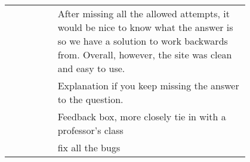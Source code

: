 {\begin{longtable}{R|p{0.8\linewidth}}
		 & After missing all the allowed attempts, it would be nice to know what the answer is so we have a solution to work backwards from. Overall, however, the site was clean and easy to use.                                                                                                                                                                                                                                                                                                                                                                                                                                                                                                                                                          \\
		& Explanation if you keep missing the answer to the question.                                                                                                                                                                                                                                                                                                                                                                                                                                                                                                                                                                                                                                                                                      \\
		& Feedback box, more closely tie in with a professor's class                                                                                                                                                                                                                                                                                                                                                                                                                                                                                                                                                                                                                                                                                       \\
		& fix all the bugs                                                                                                                                                                                                                                                                                                                                                                                                                                                                                                                                                                                                                                                                                                                                 \\

\end{longtable}}
